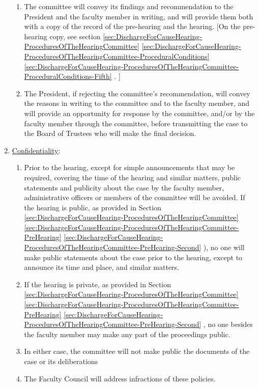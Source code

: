\begin{enumerate}[label=\alph*)]
{\begin{enumerate}[label=\arabic*)]
{									\ref{sec:NonPerformanceOfContract}
									\ref{par:NonPerformanceOfContract-Sanctions}
									).  If the committee concludes that adequate cause for dismissal has not been established, it will recommend retention of the faculty member either with no penalties or with an academic penalty less than dismissal.}
								\item{
									\label{sec:DischargeForCauseHearing-ProceduresOfTheHearingCommittee-Hearing-Eighth}
									The committee will convey its findings and recommendation to the President and the faculty member in writing, and will provide them both with a copy of the record of the pre-hearing and the hearing.  [On the pre-hearing copy,
											see section
											\ref{sec:DischargeForCauseHearing-ProceduresOfTheHearingCommittee}
											\ref{sec:DischargeForCauseHearing-ProceduresOfTheHearingCommittee-ProceduralConditions}
											\ref{sec:DischargeForCauseHearing-ProceduresOfTheHearingCommittee-ProceduralConditions-Fifth}
											.
										]}
								\item{The President, if rejecting the committee's recommendation, will convey the reasons in writing to the committee and to the faculty member, and will provide an opportunity for response by the committee, and/or by the faculty member through the committee, before transmitting the case to the Board of Trustees who will make the final decision.}
							\end{enumerate}
						}
						\item{\underline{Confidentiality}:
							\begin{enumerate}[label=\arabic*)]
								\item{Prior to the hearing, except for simple announcements that may be required, covering the time of the hearing and similar matters, public statements and publicity about the case by the faculty member, administrative officers or members of the committee will be avoided.  If the hearing is public, as provided in
									Section
									\ref{sec:DischargeForCauseHearing-ProceduresOfTheHearingCommittee}
									\ref{sec:DischargeForCauseHearing-ProceduresOfTheHearingCommittee-PreHearing}
									\ref{sec:DischargeForCauseHearing-ProceduresOfTheHearingCommittee-PreHearing-Second}
									), no one will make public statements about the case prior to the hearing, except to announce its time and place, and similar matters.}
								\item{If the hearing is private, as provided in
									Section
									\ref{sec:DischargeForCauseHearing-ProceduresOfTheHearingCommittee}
									\ref{sec:DischargeForCauseHearing-ProceduresOfTheHearingCommittee-PreHearing}
									\ref{sec:DischargeForCauseHearing-ProceduresOfTheHearingCommittee-PreHearing-Second}
									, no one besides the faculty member may make any part of the proceedings public.}
								\item{In either case, the committee will not make public the documents of the case or its deliberations}
								\item{The Faculty Council will address infractions of these policies.}
							\end{enumerate}
						}
					\end{enumerate}
